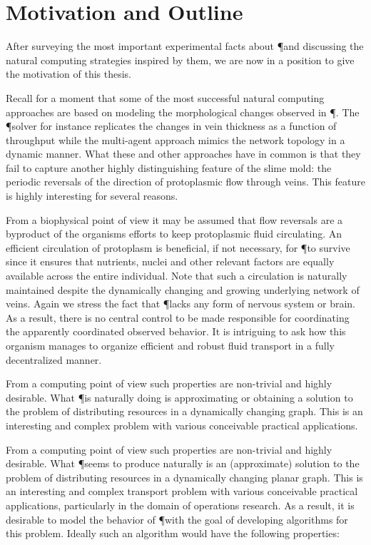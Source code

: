 \section{Motivation and Outline}

	After surveying the most important experimental facts about \P and discussing the natural computing strategies inspired by them, we are now in a position to give the motivation of this thesis. 

	Recall for a moment that some of the most successful natural computing approaches are based on modeling the morphological changes observed in \P. The \P solver for instance replicates the changes in vein thickness as a function of throughput while the multi-agent approach mimics the network topology in a dynamic manner. What these and other approaches have in common is that they fail to capture another highly distinguishing feature of the slime mold: the periodic reversals of the direction of protoplasmic flow through veins. This feature is highly interesting for several reasons. 

	From a biophysical point of view it may be assumed that flow reversals are a byproduct of the organisms efforts to keep protoplasmic fluid circulating. An efficient circulation of protoplasm is beneficial, if not necessary, for \P to survive since it ensures that nutrients, nuclei and other relevant factors are equally available across the entire individual. Note that such a circulation is naturally maintained despite the dynamically changing and growing underlying network of veins. Again we stress the fact that \P lacks any form of nervous system or brain. As a result, there is no central control to be made responsible for coordinating the apparently coordinated observed behavior. It is intriguing to ask how this organism manages to organize efficient and robust fluid transport in a fully decentralized manner.

	From a computing point of view such properties are non-trivial and highly desirable. What \P is naturally doing is approximating or obtaining a solution to the problem of distributing resources in a dynamically changing graph. This is an interesting and complex problem with various conceivable practical applications. 

	From a computing point of view such properties are non-trivial and highly desirable. What \P seems to produce naturally is an (approximate) solution to the problem of distributing resources in a dynamically changing planar graph. This is an interesting and complex transport problem with various conceivable practical applications, particularly in the domain of operations research. As a result, it is desirable to model the behavior of \P with the goal of developing algorithms for this problem. Ideally such an algorithm would have the following properties:

